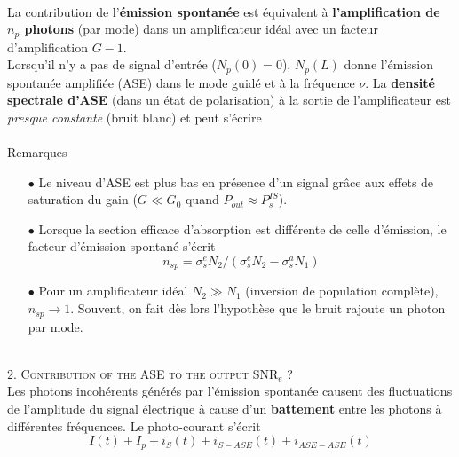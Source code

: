 \ \\

La contribution de l'\textbf{émission spontanée} est équivalent à\textbf{ l'amplification de $n_p$ photons} 
(par mode) dans un amplificateur idéal avec un facteur d'amplification $G-1$.\\


Lorsqu'il n'y a pas de signal d'entrée ($N_p(0)=0$), $N_p(L)$ donne l'émission spontanée amplifiée (ASE) dans le
mode guidé et à la fréquence $\nu$. La \textbf{densité spectrale d'ASE} (dans un état de polarisation) à la
sortie de l'amplificateur est \textit{presque constante} (bruit blanc) et peut s'écrire\\

\ \\

Remarques
\begin{itemize}
\item[$\bullet$] Le niveau d'ASE est plus bas en présence d'un signal grâce aux effets de saturation du 
gain ($G\ll G_0$ quand $P_{out} \approx P_s^{IS}$).
\item[$\bullet$] Lorsque la section efficace d'absorption est différente de celle d'émission, le facteur
d'émission spontané s'écrit
\begin{equation}
{n_{sp}} = \sigma _s^e{N_2}/(\sigma _s^e{N_2} - \sigma _s^a{N_1})
\end{equation}
\item[$\bullet$] Pour un amplificateur idéal $N_2\gg N_1$ (inversion de population complète), $n_{sp}\to1$.
Souvent, on fait dès lors l'hypothèse que le bruit rajoute un photon par mode.
\end{itemize}\ \\

\textsc{2. Contribution of the ASE to the output SNR$_e$ ?}\\
Les photons incohérents générés par l'émission spontanée causent des fluctuations de l'amplitude du signal
électrique à cause d'un \textbf{battement} entre les photons à différentes fréquences. Le photo-courant s'écrit
	\begin{equation}
I(t) + I_p+i_S(t)+i_{S-ASE}(t)+i_{ASE-ASE}(t)
\end{equation}

